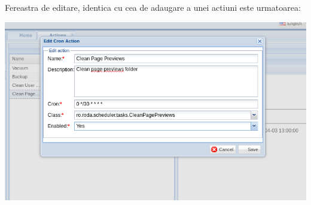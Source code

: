 Fereastra de editare, identica cu cea de adaugare a unei actiuni este
urmatoarea: 

\includegraphics[width=\textwidth]{cronedit}
